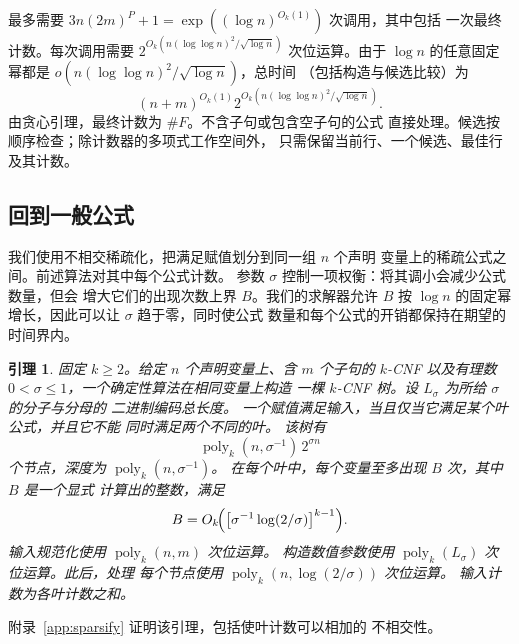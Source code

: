 \documentclass[11pt,reqno]{amsart}
\numberwithin{equation}{section}
\newtheorem{lemma}[theorem]{引理}
\theoremstyle{definition}\newtheorem{definition}[theorem]{定义}
\theoremstyle{remark}\newtheorem{remark}[theorem]{注}
\newcommand{\poly}{\operatorname{poly}}
\renewcommand{\le}{\leqslant}
\renewcommand{\ge}{\geqslant}
\begin{document}
最多需要 $3n(2m)^P+1=\exp((\log n)^{O_k(1)})$ 次调用，其中包括
一次最终计数。每次调用需要
$2^{O_k(n(\log\log n)^2/\sqrt{\log n})}$ 次位运算。由于 $\log n$
的任意固定幂都是 $o(n(\log\log n)^2/\sqrt{\log n})$，总时间
（包括构造与候选比较）为
\begin{equation}\label{eq:sparse-formula-cost}
 (n+m)^{O_k(1)}2^{O_k(n(\log\log n)^2/\sqrt{\log n})}.
\end{equation}
由贪心引理，最终计数为 $\#F$。不含子句或包含空子句的公式
直接处理。候选按顺序检查；除计数器的多项式工作空间外，
只需保留当前行、一个候选、最佳行及其计数。

\subsection{回到一般公式}\label{subsec:general-reduction}

我们使用不相交稀疏化，把满足赋值划分到同一组 $n$ 个声明
变量上的稀疏公式之间。前述算法对其中每个公式计数。
参数 $\sigma$ 控制一项权衡：将其调小会减少公式数量，但会
增大它们的出现次数上界 $B$。我们的求解器允许 $B$ 按
$\log n$ 的固定幂增长，因此可以让 $\sigma$ 趋于零，同时使公式
数量和每个公式的开销都保持在期望的时间界内。

\begin{lemma}\label{lem:sparsify}
固定 $k\ge2$。给定 $n$ 个声明变量上、含 $m$ 个子句的 $k$-CNF
以及有理数 $0<\sigma\le1$，一个确定性算法在相同变量上构造
一棵 $k$-CNF 树。设 $L_\sigma$ 为所给 $\sigma$ 的分子与分母的
二进制编码总长度。
一个赋值满足输入，当且仅当它满足某个叶公式，并且它不能
同时满足两个不同的叶。
该树有
\[
 \operatorname{poly}_k(n,\sigma^{-1})\,2^{\sigma n}
\]
个节点，深度为 $\poly_k(n,\sigma^{-1})$。
在每个叶中，每个变量至多出现 $B$ 次，其中 $B$ 是一个显式
计算出的整数，满足
\[
 B=O_k\!\Bigl(\bigl[\sigma^{-1}\log(2/\sigma)\bigr]^{k-1}\Bigr).
\]
输入规范化使用 $\poly_k(n,m)$ 次位运算。
构造数值参数使用 $\poly_k(L_\sigma)$ 次位运算。此后，处理
每个节点使用 $\poly_k(n,\log(2/\sigma))$ 次位运算。
输入计数为各叶计数之和。
\end{lemma}
附录~\ref{app:sparsify} 证明该引理，包括使叶计数可以相加的
不相交性。
\end{document}

